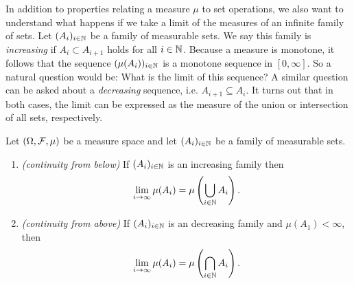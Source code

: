 In addition to properties relating a measure $\mu$ to set operations, we also want to understand what happens if we take a limit of the measures of an infinite family of sets. Let $(A_i)_{i \in \mathbb N}$ be a family of measurable sets. We say this family is \emph{increasing} if $A_i \subset A_{i+1}$ holds for all $i \in \mathbb N$. Because a measure is monotone, it follows that the sequence $(\mu(A_i))_{i \in \mathbb N}$ is a monotone sequence in $[0,\infty]$. So a natural question would be: What is the limit of this sequence? A similar question can be asked about a \emph{decreasing} sequence, i.e. $A_{i+1} \subseteq A_i$. It turns out that in both cases, the limit can be expressed as the measure of the union or intersection of all sets, respectively.

\begin{proposition}\label{prop:continuity_measure}
Let $(\Omega, \mathcal F, \mu)$ be a measure space and let $(A_i)_{i \in \mathbb N}$ be a family of measurable sets. 

\begin{enumerate}
\item \textit{(continuity from below)} If $(A_i)_{i \in \mathbb N}$ is an increasing family then
\[
	\lim_{i \to \infty} \mu(A_i) = \mu\left(\bigcup_{i \in \mathbb N} A_i\right).
\]
\item \textit{(continuity from above)} If $(A_i)_{i \in \mathbb N}$ is an decreasing family and $\mu(A_1) < \infty$, then
\[
	\lim_{i \to \infty} \mu(A_i) = \mu\left(\bigcap_{i \in \mathbb N} A_i\right).
\]
\end{enumerate}
\end{proposition}


